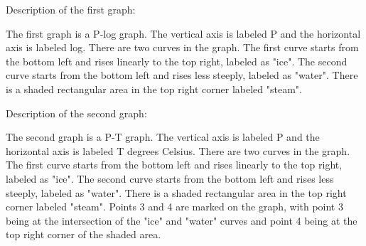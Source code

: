 Description of the first graph:

The first graph is a P-log graph. The vertical axis is labeled P and the horizontal axis is labeled log. There are two curves in the graph. The first curve starts from the bottom left and rises linearly to the top right, labeled as "ice". The second curve starts from the bottom left and rises less steeply, labeled as "water". There is a shaded rectangular area in the top right corner labeled "steam".

Description of the second graph:

The second graph is a P-T graph. The vertical axis is labeled P and the horizontal axis is labeled T degrees Celsius. There are two curves in the graph. The first curve starts from the bottom left and rises linearly to the top right, labeled as "ice". The second curve starts from the bottom left and rises less steeply, labeled as "water". There is a shaded rectangular area in the top right corner labeled "steam". Points 3 and 4 are marked on the graph, with point 3 being at the intersection of the "ice" and "water" curves and point 4 being at the top right corner of the shaded area.